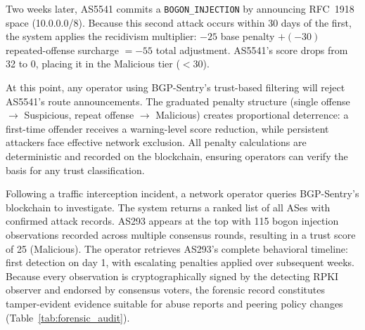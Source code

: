 Two weeks later, AS5541 commits a \texttt{BOGON\_INJECTION} by announcing RFC~1918 space (10.0.0.0/8). Because this second attack occurs within 30 days of the first, the system applies the recidivism multiplier: $-25$ base penalty $+ (-30)$ repeated-offense surcharge $= -55$ total adjustment. AS5541's score drops from 32 to 0, placing it in the Malicious tier ($<$30).

At this point, any operator using BGP-Sentry's trust-based filtering will reject AS5541's route announcements. The graduated penalty structure (single offense $\to$ Suspicious, repeat offense $\to$ Malicious) creates proportional deterrence: a first-time offender receives a warning-level score reduction, while persistent attackers face effective network exclusion. All penalty calculations are deterministic and recorded on the blockchain, ensuring operators can verify the basis for any trust classification.

Following a traffic interception incident, a network operator queries BGP-Sentry's blockchain to investigate. The system returns a ranked list of all ASes with confirmed attack records. AS293 appears at the top with 115 bogon injection observations recorded across multiple consensus rounds, resulting in a trust score of 25 (Malicious). The operator retrieves AS293's complete behavioral timeline: first detection on day 1, with escalating penalties applied over subsequent weeks. Because every observation is cryptographically signed by the detecting RPKI observer and endorsed by consensus voters, the forensic record constitutes tamper-evident evidence suitable for abuse reports and peering policy changes (Table~\ref{tab:forensic_audit}).
